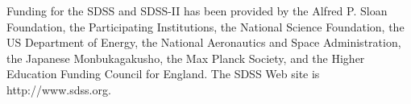 \documentclass{aastex63}
\begin{document}

\acknowledgments
Funding for the SDSS and SDSS-II has been provided by the Alfred P. Sloan Foundation, the Participating
Institutions, the National Science Foundation, the US Department of Energy, the National Aeronautics and 
Space Administration, the Japanese Monbukagakusho, the Max Planck Society, and the Higher Education 
Funding Council for England. The SDSS Web site is http://www.sdss.org.
 
\vspace{5mm}


{}


%
 
\end{document}
